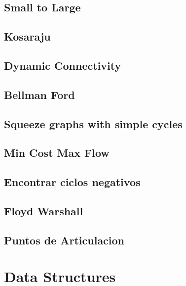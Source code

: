 \subsection{   Small to Large}
\raggedbottom
\hrulefill
\subsection{   Kosaraju}
\raggedbottom
\hrulefill
\subsection{   Dynamic Connectivity}
\raggedbottom
\hrulefill
\subsection{   Bellman Ford}
\raggedbottom
\hrulefill
\subsection{   Squeeze graphs with simple cycles}
\raggedbottom
\hrulefill
\subsection{   Min Cost Max Flow}
\raggedbottom
\hrulefill
\subsection{   Encontrar ciclos negativos}
\raggedbottom
\hrulefill
\subsection{   Floyd Warshall}
\raggedbottom
\hrulefill
\subsection{   Puntos de Articulacion}
\raggedbottom
\hrulefill

\section{Data Structures}
